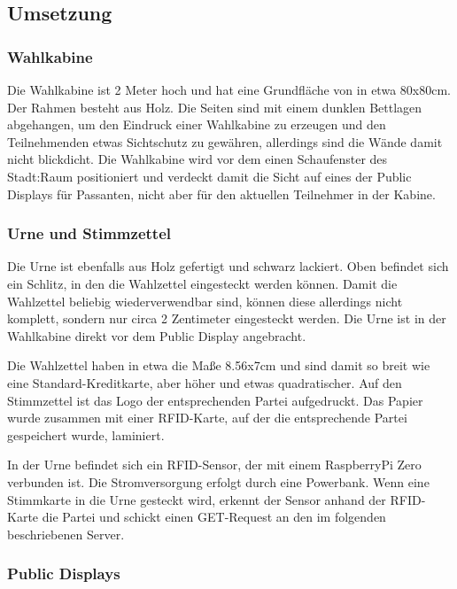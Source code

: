 \subsection{Umsetzung}\label{umsetzung}

\subsubsection{Wahlkabine}\label{wahlkabine}

Die Wahlkabine ist 2 Meter hoch und hat eine Grundfläche von in etwa 80x80cm.
Der Rahmen besteht aus Holz.
Die Seiten sind mit einem dunklen Bettlagen abgehangen, um den Eindruck einer Wahlkabine zu erzeugen und den Teilnehmenden etwas Sichtschutz zu gewähren, allerdings sind die Wände damit nicht blickdicht.
Die Wahlkabine wird vor dem einen Schaufenster des Stadt:Raum positioniert und verdeckt damit die Sicht auf eines der Public Displays für Passanten, nicht aber für den aktuellen Teilnehmer in der Kabine.

\subsubsection{Urne und Stimmzettel}\label{urne-und-stimmzettel}

Die Urne ist ebenfalls aus Holz gefertigt und schwarz lackiert. Oben befindet sich ein Schlitz, in den die Wahlzettel eingesteckt werden können.
Damit die Wahlzettel beliebig wiederverwendbar sind, können diese allerdings nicht komplett, sondern nur circa 2 Zentimeter eingesteckt werden.
Die Urne ist in der Wahlkabine direkt vor dem Public Display angebracht.

Die Wahlzettel haben in etwa die Maße 8.56x7cm und sind damit so breit wie eine Standard-Kreditkarte, aber höher und etwas quadratischer.
Auf den Stimmzettel ist das Logo der entsprechenden Partei aufgedruckt.
Das Papier wurde zusammen mit einer RFID-Karte, auf der die entsprechende Partei gespeichert wurde, laminiert.

In der Urne befindet sich ein RFID-Sensor, der mit einem RaspberryPi Zero verbunden ist.
Die Stromversorgung erfolgt durch eine Powerbank.
Wenn eine Stimmkarte in die Urne gesteckt wird, erkennt der Sensor anhand der RFID-Karte die Partei und schickt einen GET-Request an den im folgenden beschriebenen Server.

\subsubsection{Public Displays}\label{public-displays}

